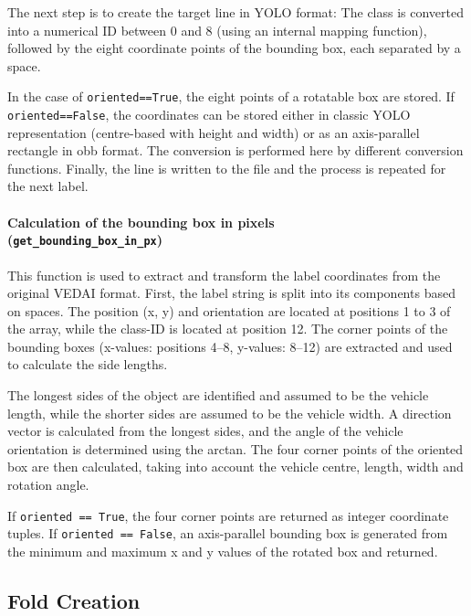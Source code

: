 The next step is to create the target line in \acrshort{YOLO} format: The class is converted into a numerical \acrshort{ID} between 0 and 8 (using an internal mapping function), followed by the eight coordinate points of the bounding box, each separated by a space.

In the case of \lstinline|oriented==True|, the eight points of a rotatable box are stored. If \lstinline|oriented==False|, the coordinates can be stored either in classic \acrshort{YOLO} representation (centre-based with height and width) or as an axis-parallel rectangle in \acrshort{obb} format. The conversion is performed here by different conversion functions. Finally, the line is written to the file and the process is repeated for the next label.

\paragraph{Calculation of the bounding box in pixels \\ (\lstinline|get_bounding_box_in_px|)}

This function is used to extract and transform the label coordinates from the original \acrshort{VEDAI} format. First, the label string is split into its components based on spaces. The position (x, y) and orientation are located at positions 1 to 3 of the array, while the class-\acrshort{ID} is located at position 12. The corner points of the bounding boxes (x-values: positions 4–8, y-values: 8–12) are extracted and used to calculate the side lengths.

The longest sides of the object are identified and assumed to be the vehicle length, while the shorter sides are assumed to be the vehicle width. A direction vector is calculated from the longest sides, and the angle of the vehicle orientation is determined using the arctan. The four corner points of the oriented box are then calculated, taking into account the vehicle centre, length, width and rotation angle.

If \lstinline|oriented == True|, the four corner points are returned as integer coordinate tuples. If \lstinline|oriented == False|, an axis-parallel bounding box is generated from the minimum and maximum x and y values of the rotated box and returned.


\subsection{Fold Creation}
\label{subsec:Fold_creation}


